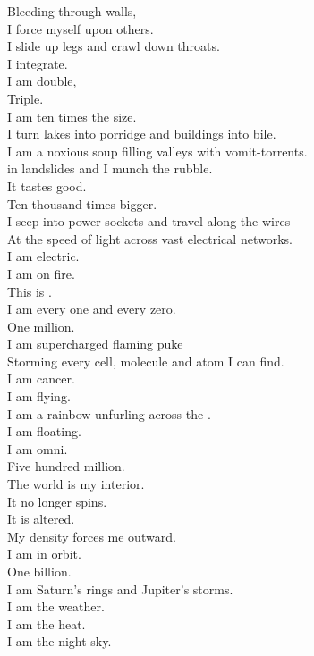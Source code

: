 Bleeding through walls, \\
I force myself upon others. \\
I slide up legs and crawl down throats. \\
I integrate. \\
I am double, \\
Triple. \\
I am ten times the size. \\

I turn lakes into porridge and buildings into bile. \\
I am a noxious soup filling valleys with vomit-torrents. \\
 in landslides and I munch the rubble. \\
It tastes good. \\

Ten thousand times bigger. \\
I seep into power sockets and travel along the wires \\
At the speed of light across vast electrical networks. \\
I am electric. \\
I am on fire. \\
This is . \\
I am every one and every zero. \\

One million. \\
I am supercharged flaming puke \\
Storming every cell, molecule and atom I can find. \\
I am cancer. \\
I am flying. \\
I am a rainbow unfurling across the . \\
I am floating. \\
I am omni. \\

Five hundred million. \\
The world is my interior. \\
It no longer spins. \\
It is altered. \\
My density forces me outward. \\
I am in orbit. \\

One billion. \\
I am Saturn's rings and Jupiter's storms. \\
I am the weather. \\
I am the  heat. \\
I am the night sky. \\

